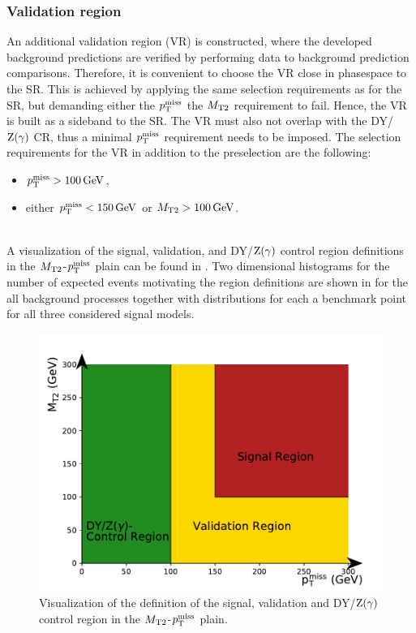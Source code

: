 \subsubsection{Validation region}
An additional validation region (VR) is constructed, where the developed background predictions are verified by performing data to background prediction comparisons. Therefore, it is convenient to choose the VR close in phasespace to the SR. This is achieved by applying the same selection requirements as for the SR, but demanding either the $p_{\mathrm{T}}^\text{miss}$ the $M_{\mathrm{T2}}$ requirement to fail. Hence, the VR is built as a sideband to the SR. The VR must also not overlap with the DY/$\mathrm{Z}(\gamma)$ CR, thus a minimal $p_{\mathrm{T}}^\text{miss}$ requirement needs to be imposed. The selection requirements for the VR in addition to the preselection are the following:
\begin{itemize}
 \item $p_{\mathrm{T}}^\text{miss}>100\,\text{Ge\hspace{-.08em}V}$,
 \item either $p_{\mathrm{T}}^\text{miss}<150\,\text{Ge\hspace{-.08em}V}$ or $M_{\mathrm{T2}}>100\,\text{Ge\hspace{-.08em}V}$.
\end{itemize}
\\
A visualization of the signal, validation, and DY/$\mathrm{Z}(\gamma)$ control region definitions in the $M_{\mathrm{T2}}$-$p_{\mathrm{T}}^\text{miss}$ plain can be found in . Two dimensional histograms for the number of expected events motivating the region definitions are shown in  for the all background processes together with distributions for each a benchmark point for all three considered signal models.
\begin{figure}[tbp]
 \centering
 \includegraphics[width=\pairwidth]{figures/figures/regions}
 \caption{Visualization of the definition of the signal, validation and DY/$\mathrm{Z}(\gamma)$ control region in the $M_{\mathrm{T2}}$-$p_{\mathrm{T}}^\text{miss}$ plain.}
 \label{fig:Regions}
\end{figure}
